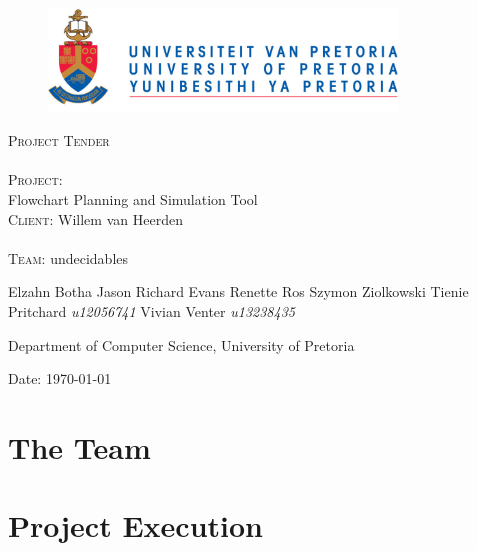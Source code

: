 \documentclass[12pt]{article}
\begin{document}
\begin{titlepage}
	\begin{center}
		
		\begin{figure}[t]
			\centering
			\includegraphics[width=350px]{UP_Logo.png}
		\end{figure}
		
		\textsc{\Huge Project Tender} \\ 

		\textsc{\huge \\Project:\\	}
		\huge Flowchart Planning and Simulation Tool
		\textsc{\Large \\Client:}
		\large Willem van Heerden \\

		\textsc{\huge \\ Team:}
		\huge \textsc{}undecidables\textsc{}
		\begin{flushright} \large
			Elzahn Botha 		\emph{} \newline
			Jason Richard Evans	\emph{} \newline
			Renette Ros			\emph{} \newline
			Szymon Ziolkowski	\emph{} \newline
			Tienie Pritchard 	\emph{u12056741} \newline
			Vivian Venter 		\emph{u13238435} \newline
		\end{flushright}
		\small Department of Computer Science, University of Pretoria \\

	\vfill

	{\large Date: \today}		
		
		
	\end{center}
\end{titlepage}

\newpage
\tableofcontents

\pagebreak

\section{The Team}


\section{Project Execution}

\end{document}
